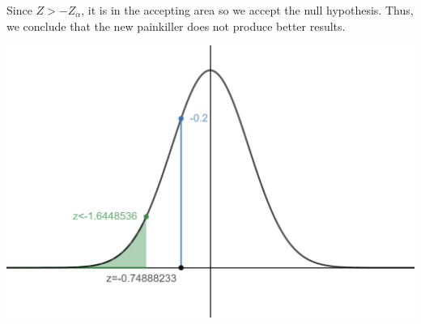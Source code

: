 \documentclass[12pt]{article}
\begin{document}
Since $Z > -Z_{\alpha}$, it is in the accepting area so we accept the null hypothesis. Thus, we conclude that the new painkiller does not produce better results.

\vspace{0.5cm}

\begin{center}
    \includegraphics[scale=0.35]{3c_new.png}
\end{center}
\end{document}
